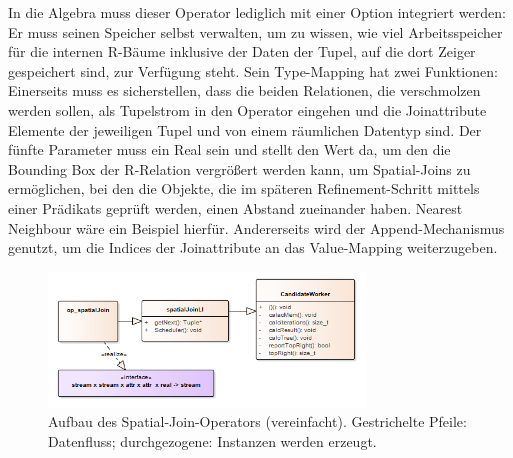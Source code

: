 \documentclass[a4paper,12pt,twoside]{article}
\begin{document}
In die Algebra muss dieser Operator lediglich mit einer Option integriert werden: Er muss seinen Speicher selbst verwalten, um zu wissen, wie viel Arbeitsspeicher für die internen R-Bäume inklusive der Daten der Tupel, auf die dort Zeiger gespeichert sind, zur Verfügung steht. Sein Type-Mapping hat zwei Funktionen: Einerseits muss es sicherstellen, dass die beiden Relationen, die verschmolzen werden sollen, als Tupelstrom in den Operator eingehen und die Joinattribute Elemente der jeweiligen Tupel und von einem räumlichen Datentyp sind. Der fünfte Parameter muss ein Real sein und stellt den Wert da, um den die Bounding Box der R-Relation vergrößert werden kann, um Spatial-Joins zu ermöglichen, bei den die Objekte, die im späteren Refinement-Schritt mittels einer Prädikats geprüft werden, einen Abstand zueinander haben. Nearest Neighbour wäre ein Beispiel hierfür. Andererseits wird der Append-Mechanismus genutzt, um die Indices der Joinattribute an das Value-Mapping weiterzugeben.

\begin{figure}
	\centering
	\includegraphics[width=0.75\textwidth]{Bilder/spatialJoin.png}
	\caption{Aufbau des Spatial-Join-Operators (vereinfacht). Gestrichelte Pfeile: Datenfluss; durchgezogene: Instanzen werden erzeugt.}
	\label{img:KlassSJ}
\end{figure}
\end{document}
